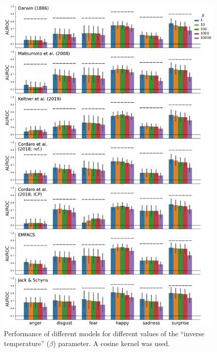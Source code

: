 \documentclass[11pt,american,a4paper,oneside,]{memoir} %
\begin{document}
\begin{figure}
\centering
\includegraphics{_bookdown_files/hypothesis-kernel-analysis-files/figures/figure_S2.pdf}
\caption{\label{fig:fig-hka-S2}Performance of different models for different values of the ``inverse temperature'' (\(\beta\)) parameter. A cosine kernel was used.}
\end{figure}
\end{document}
